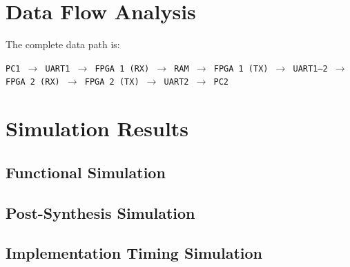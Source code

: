 \documentclass[11pt,a4paper]{article}
\begin{document}
\section{Data Flow Analysis}

The complete data path is:

\begin{center}
\texttt{PC1 $\rightarrow$ UART1 $\rightarrow$ FPGA\,1\,(RX) $\rightarrow$ RAM $\rightarrow$ FPGA\,1\,(TX) $\rightarrow$ UART1--2 $\rightarrow$ FPGA\,2\,(RX) $\rightarrow$ FPGA\,2\,(TX) $\rightarrow$ UART2 $\rightarrow$ PC2}
\end{center}



\section{Simulation Results}

\subsection{Functional Simulation}

\subsection{Post-Synthesis Simulation}

\subsection{Implementation Timing Simulation}
\end{document}
